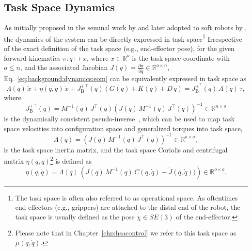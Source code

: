 \subsection{Task Space Dynamics}
As initially proposed in the seminal work by \citet{khatib1987unified} and later adopted to soft robots by \citet{della2020model}, the dynamics of the system can be directly expressed in task space\footnote{The task space is often also referred to as operational space. As oftentimes end-effectors (e.g., grippers) are attached to the distal end of the robot, the task space is usually defined as the pose $\chi \in SE(3)$ of the end-effector.}
Irrespective of the exact definition of the task space (e.g., end-effector pose), for the given forward kinematics $\pi: q \mapsto x$, where $x \in \mathbb{R}^o$ is the task-space coordinate with $o \leq n$, and the associated Jacobian $J(q) = \frac{\partial \pi}{\partial q} \in \mathbb{R}^{o \times n}$, Eq.~\ref{eq:background:dynamics:eom} can be equivalently expressed in task space as
\begin{equation}
    \Lambda(q) \, \ddot{x} + \eta(q, \dot{q}) \, \dot{x} + J_\mathrm{B}^{+\top}(q) \left ( G(q) + K(q) + D \, \dot{q} \right ) = J_\mathrm{B}^{+^\top}(q) \, A(q) \, \tau,
\end{equation}
where 
\begin{equation}
    J_\mathrm{B}^{+\top}(q) = M^{-1}(q) \, J^\top(q) \left ( J(q) \, M^{-1}(q) \, J^\top(q) \right )^{-1} \in \mathbb{R}^{n \times o}
\end{equation}
is the dynamically consistent pseudo-inverse~\citep{chang1995manipulator}, which can be used to map task space velocities into configuration space and generalized torques into task space,
\begin{equation}
    \Lambda(q) = \left ( J(q) \, M^{-1}(q) \, J^\top(q) \right )^{-1} \in \mathbb{R}^{o \times o},
\end{equation}
is the task space inertia matrix, and the task space Coriolis and centrifugal matrix $\eta(q, \dot{q})$\footnote{Please note that in Chapter~\ref{chp:hsacontrol} we refer to this task space as $\mu(q,\dot{q})$.} is defined as~\citep{khatib1987unified, della2020model}
\begin{equation}
    \eta(q, \dot{q}) = \Lambda(q) \, \left ( J(q) \, M^{-1}(q) \, C(q,\dot{q}) - \dot{J}(q,\dot{q})) \right ) \in \mathbb{R}^{o \times o}.
\end{equation}


